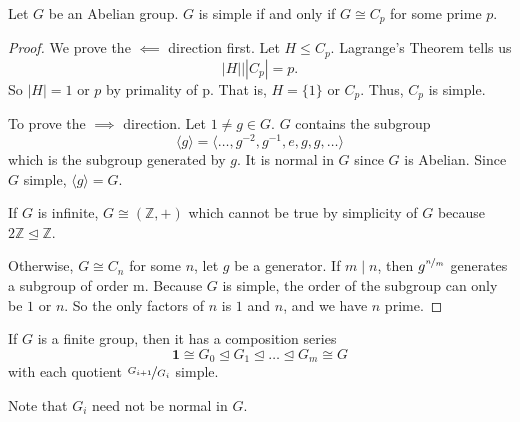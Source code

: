 \begin{lemma}
    Let \(G\) be an Abelian group. \(G\) is simple if and only if \(G \cong C_p\) for some prime \(p\).
\end{lemma}
\begin{proof}
    We prove the \(\impliedby \) direction first. Let \(H \leq C_p\). Lagrange's Theorem tells us
    \[
        \left\vert H \right\vert \big\vert \left\vert C_p \right\vert = p.
    \]
    So \(\left\vert H \right\vert = 1\) or \(p\) by primality of p. That is, \(H = \{1\}\) or \(C_p\). Thus, \(C_p\) is simple.

    To prove the \(\implies\) direction. Let \(1 \neq g \in G\). \(G\) contains the subgroup
    \[
        \langle g\rangle = \langle\ldots ,g^{-2},g^{-1},e,g,g, \ldots\rangle 
    \]
    which is the subgroup generated by \(g\). It is normal in \(G\) since \(G\) is Abelian. Since \(G\) simple, \(\langle g\rangle = G\).

    If \(G\) is infinite, \(G \cong (\mathbb{Z}, +)\) which cannot be true by simplicity of \(G\) because \(2\mathbb{Z}\trianglelefteq \mathbb{Z}\).

    Otherwise, \(G \cong C_n\) for some \(n\), let \(g\) be a generator. If \(m\mid n\), then \(g^{\nicefrac{n}{m}}\) generates a subgroup of order m. Because \(G\) is simple, the order of the subgroup can only be \(1\) or \(n\). So the only factors of \(n\) is \(1\) and \(n\), and we have \(n\) prime.
\end{proof}
\begin{lemma}
    If \(G\) is a finite group, then it has a composition series
    \[
        \textbf{1} \cong G_0 \trianglelefteq G_1 \trianglelefteq \ldots \trianglelefteq G_m \cong G
    \]
    with each quotient \(\nicefrac{G_{i+1}}{G_{i}}\) simple.

    Note that \(G_i\) need not be normal in \(G\).
    \label{compseries}
\end{lemma}